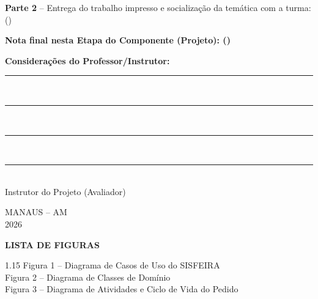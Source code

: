 \documentclass[12pt,a4paper]{article}
\newcommand{\varMunicipio}{MANAUS -- AM}
\newcommand{\varAno}{2026}
\begin{document}
\vspace{0.4cm}
\noindent \textbf{Parte 2} -- Entrega do trabalho impresso e socialização da temática com a turma: (\hspace{1.5cm})\underline{\hspace{3.5cm}}

\vspace{0.8cm}
\begin{center}
    \textbf{Nota final nesta Etapa do Componente (Projeto): (\hspace{1.5cm})\underline{\hspace{3.5cm}}}
\end{center}

\vspace{0.6cm}
\noindent \textbf{Considerações do Professor/Instrutor:}
\vspace{0.2cm}

\noindent\rule{\textwidth}{0.4pt}\\[0.5cm]
\rule{\textwidth}{0.4pt}\\[0.5cm]
\rule{\textwidth}{0.4pt}\\[0.5cm]
\rule{\textwidth}{0.4pt}

\begin{center}
    \underline{\hspace{9cm}}\\
    Instrutor do Projeto (Avaliador)
    
    \vspace*{\fill}
    
    \varMunicipio\\
    \varAno
\end{center}
\newpage

\thispagestyle{empty}
\begin{center}
    {\bfseries\MakeUppercase{Lista de Figuras}}
\end{center}
\vspace{0.5cm}
\begin{spacing}{1.15}
\noindent Figura 1 -- Diagrama de Casos de Uso do SISFEIRA \\
Figura 2 -- Diagrama de Classes de Domínio \\
Figura 3 -- Diagrama de Atividades e Ciclo de Vida do Pedido 
\end{spacing}
\newpage
\end{document}
